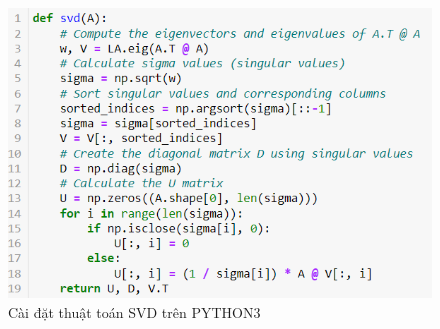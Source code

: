 \documentclass[12pt,a4paper,oneside]{report}
\numberwithin{equation}{section}
\begin{document}
\newpage

\begin{figure}[htp]
	\centering
	\includegraphics[scale=0.9]{implement_svd.png}
	\caption{Cài đặt thuật toán SVD trên PYTHON3}
	\label{fig:svd_algo}
\end{figure}
\end{document}
